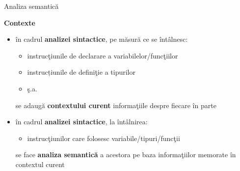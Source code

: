 \documentclass[pdf]{beamer}
\begin{document}
\begin{frame}{Analiza semantică}

\textbf{Contexte}

\begin{itemize}
\item
în cadrul \textbf{analizei sintactice}, pe măsură ce se întâlnesc:
\begin{itemize}
\item
instrucţiunile de declarare a variabilelor/funcţiilor
\item
instrucțiunile de definiţie a tipurilor
\item
ş.a. 
\end{itemize}
se adaugă \textbf{contextului curent} informaţiile despre fiecare în parte
\newline

\item
în cadrul \textbf{analizei sintactice}, la întâlnirea:
\begin{itemize}
\item
instrucţiunilor care folosesc variabile/tipuri/funcţii
\end{itemize}
se face \textbf{analiza semantică} a acestora pe baza informaţiilor memorate în contextul curent
\end{itemize}
\end{frame}
\end{document}
